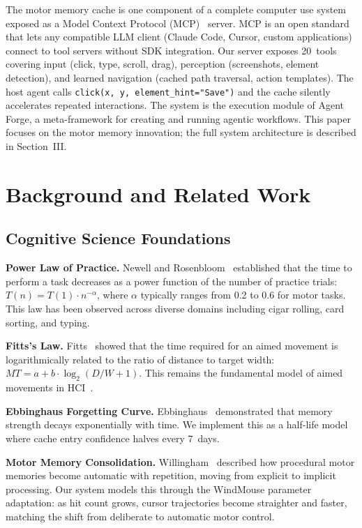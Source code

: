 \documentclass[conference]{IEEEtran}
\begin{document}
The motor memory cache is one component of a complete computer use system exposed as a Model Context Protocol (MCP)~\cite{mcp2024} server. MCP is an open standard that lets any compatible LLM client (Claude Code, Cursor, custom applications) connect to tool servers without SDK integration. Our server exposes 20~tools covering input (click, type, scroll, drag), perception (screenshots, element detection), and learned navigation (cached path traversal, action templates). The host agent calls \texttt{click(x, y, element\_hint="Save")} and the cache silently accelerates repeated interactions. The system is the execution module of Agent Forge, a meta-framework for creating and running agentic workflows. This paper focuses on the motor memory innovation; the full system architecture is described in Section~III.

\section{Background and Related Work}

\subsection{Cognitive Science Foundations}

\textbf{Power Law of Practice.} Newell and Rosenbloom~\cite{newell1981} established that the time to perform a task decreases as a power function of the number of practice trials: $T(n) = T(1) \cdot n^{-\alpha}$, where $\alpha$ typically ranges from 0.2 to 0.6 for motor tasks. This law has been observed across diverse domains including cigar rolling, card sorting, and typing.

\textbf{Fitts's Law.} Fitts~\cite{fitts1954} showed that the time required for an aimed movement is logarithmically related to the ratio of distance to target width: $MT = a + b \cdot \log_2(D/W + 1)$. This remains the fundamental model of aimed movements in HCI~\cite{mackenzie1992,soukoreff2004}.

\textbf{Ebbinghaus Forgetting Curve.} Ebbinghaus~\cite{ebbinghaus1885} demonstrated that memory strength decays exponentially with time. We implement this as a half-life model where cache entry confidence halves every 7~days.

\textbf{Motor Memory Consolidation.} Willingham~\cite{willingham1998} described how procedural motor memories become automatic with repetition, moving from explicit to implicit processing. Our system models this through the WindMouse parameter adaptation: as hit count grows, cursor trajectories become straighter and faster, matching the shift from deliberate to automatic motor control.
\end{document}
